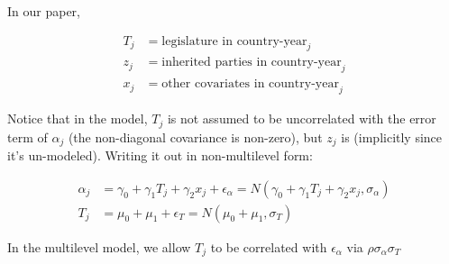 \documentclass[12pt]{article}
\begin{document}
In our paper,

\begin{align}
T_j &= \text{legislature in country-year}_j \\
z_j &= \text{inherited parties in country-year}_j \\
x_j &= \text{other covariates in country-year}_j
\end{align}

Notice that in the model, $T_j$ is not assumed to be uncorrelated with the error term of $\alpha_j$ (the non-diagonal covariance is non-zero), but $z_j$ is (implicitly since it's un-modeled). Writing it out in non-multilevel form:

\begin{align}
\alpha_j &= \gamma_0 + \gamma_1 T_j + \gamma_2 x_j + \epsilon_\alpha = N(\gamma_0 + \gamma_1 T_j + \gamma_2 x_j, \sigma_\alpha)\\
T_j &= \mu_0 + \mu_1 + \epsilon_T = N(\mu_0 + \mu_1, \sigma_T)
\end{align}

In the multilevel model, we allow $T_j$ to be correlated with $\epsilon_\alpha$ via $\rho \sigma_\alpha \sigma_T$
\end{document}
